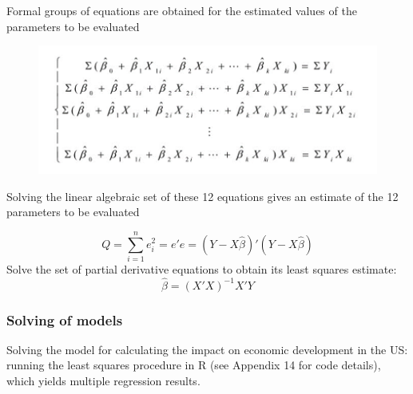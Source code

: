\documentclass{apmcmthesis}
\begin{document}
Formal groups of equations are obtained for the estimated values of the parameters to be evaluated
\begin{figure}[H]
	\centering
	\includegraphics[width=\linewidth]{screenshot004}
	\caption{}
	\label{fig:screenshot004}
\end{figure}

Solving the linear algebraic set of these 12 equations gives an estimate of the 12 parameters to be evaluated

\begin{equation}
Q=\sum_{i=1}^{n}e_i^2=e'e=(Y-X\hat{\beta})'(Y-X\hat{\beta})
\end{equation}
Solve the set of partial derivative equations to obtain its least squares estimate:
\begin{equation}
\hat{\beta}=(X'X)^{-1}X'Y
\end{equation}
\subsubsection{Solving of models}

Solving the model for calculating the impact on economic development in the US: running the least squares procedure in R (see Appendix 14 for code details), which yields multiple regression results.
\end{document}
